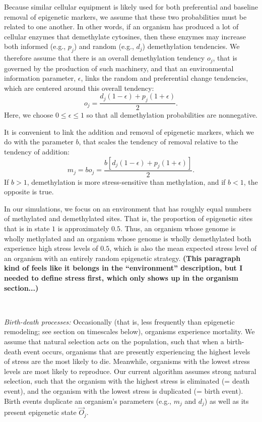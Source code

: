 \documentclass{article}
\begin{document}
Because similar cellular equipment is likely used for both preferential and baseline removal of epigenetic markers, we assume that these two probabilities must be related to one another. In other words, if an organism has produced a lot of cellular enzymes that demethylate cytosines, then these enzymes may increase both informed (e.g., $p_j$) and random (e.g., $d_j$) demethylation tendencies. We therefore assume that there is an overall demethylation tendency $o_j$, that is governed by the production of such machinery, and that an environmental information parameter, $\epsilon$, links the random and preferential change tendencies, which are centered around this overall tendency:
\begin{equation}
    o_j = \frac{ d_j\left( 1 - \epsilon \right) + p_j \left( 1+ \epsilon \right) }{2}.
\end{equation}
Here, we choose $0 \leq \epsilon \leq 1$ so that all demethylation probabilities are nonnegative.

It is convenient to link the addition and removal of epigenetic markers, which we do with the parameter $b$, that scales the tendency of removal relative to the tendency of addition:
\begin{equation}
    m_j = b o_j = \frac{b\left[ d_j\left( 1 - \epsilon \right) + p_j \left( 1+ \epsilon \right) \right]}{2}.
\end{equation}
If $b > 1$, demethylation is more stress-sensitive than methylation, and if $b < 1$, the opposite is true.

In our simulations, we focus on an environment that has roughly equal numbers of methylated and demethylated sites. That is, the proportion of epigenetic sites that is in state $1$ is approximately $0.5$. Thus, an organism whose genome is wholly methylated and an organism whose genome is wholly demethylated both experience high stress levels of $0.5$, which is also the mean expected stress level of an organism with an entirely random epigenetic strategy. \textbf{(This paragraph kind of feels like it belongs in the ``environment'' description, but I needed to define stress first, which only shows up in the organism section...)}

\ 

\noindent \textit{Birth-death processes:} Occasionally (that is, less frequently than epigenetic remodeling; see section on timescales below), organisms experience mortality. We assume that natural selection acts on the population, such that when a birth-death event occurs, organisms that are presently experiencing the highest levels of stress are the most likely to die. Meanwhile, organisms with the lowest stress levels are most likely to reproduce. Our current algorithm assumes strong natural selection, such that the organism with the highest stress is eliminated (= death event), and the organism with the lowest stress is duplicated (= birth event). Birth events duplicate an organism's parameters (e.g., $m_j$ and $d_j$) as well as its present epigenetic state $\vec{O}_j$.
\end{document}
